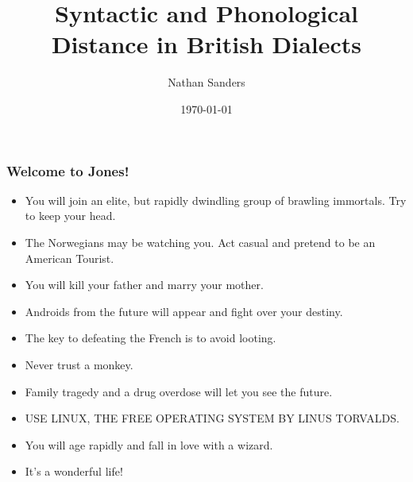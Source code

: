 \documentclass{beamer}
\title{Syntactic and Phonological Distance in British Dialects}
\author{Nathan Sanders}
\date{\today}
\begin{document}
\begin{frame}
  \frametitle{Welcome to Jones!}

  \begin{itemize}
  \item You will join an elite, but rapidly dwindling group of brawling immortals. Try to keep your head.
  \item The Norwegians may be watching you. Act casual and pretend to be an American Tourist.
  \item You will kill your father and marry your mother.
  \item  Androids from the future will appear and fight over your destiny.
  \item  The key to defeating the French is to avoid looting.
  \item  Never trust a monkey.
  \item  Family tragedy and a drug overdose will let you see the future.
  \item  USE LINUX, THE FREE OPERATING SYSTEM BY LINUS TORVALDS.
  \item  You will age rapidly and fall in love with a wizard.
  \item It's a wonderful life!
  \end{itemize}
\end{frame}

\frame{\titlepage}

\section[Outline]{}
\frame{\tableofcontents}
\end{document}
